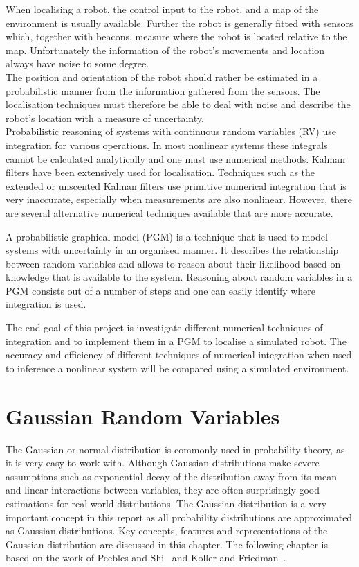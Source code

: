 \documentclass[12pt,oneside,openany,a4paper, %
afrikaans,english,
]{memoir}
\numberwithin{equation}{chapter}
\begin{document}
When localising a robot, the control input to the robot, and a map of the environment is usually available. Further the robot is generally fitted with sensors which, together with beacons, measure where the robot is located relative to the map. Unfortunately the information of the robot's movements and location always have noise to some degree.\\
The position and orientation of the robot should rather be estimated in a probabilistic manner from the information gathered from the sensors. The localisation techniques must therefore be able to deal with noise and describe the robot's location with a measure of uncertainty.\\
Probabilistic reasoning of systems with continuous random variables (RV) use integration for various operations. In most nonlinear systems these integrals cannot be calculated analytically and one must use numerical methods. Kalman filters have been extensively used for localisation. Techniques such as the extended or unscented Kalman filters use primitive numerical integration that is very inaccurate, especially when measurements are also nonlinear. However, there are several alternative numerical techniques available that are more accurate.

A probabilistic graphical model (PGM) is a technique that is used to model systems with uncertainty in an organised manner. It describes the relationship between random variables and allows to reason about their likelihood based on knowledge that is available to the system. Reasoning about random variables in a PGM consists out of a number of steps and one can easily identify where integration is used.

The end goal of this project is investigate different numerical techniques of integration and to implement them in a PGM to localise a simulated robot. The accuracy and efficiency of different techniques of numerical integration when used to inference a nonlinear system will be compared using a simulated environment.
\setcounter{secnumdepth}{2}
\chapter{Gaussian Random Variables}
The Gaussian or normal distribution is commonly used in probability theory, as it is very easy to work with. Although Gaussian distributions make severe assumptions such as exponential decay of the distribution away from its mean and linear interactions between variables, they are often surprisingly good estimations for real world distributions. The Gaussian distribution is a very important concept in this report as all probability distributions are approximated as Gaussian distributions. Key concepts, features and representations of the Gaussian distribution are discussed in this chapter. The following chapter is based on the work of Peebles and Shi~\cite{peebles} and Koller and Friedman~\cite{koller}.
\end{document}
